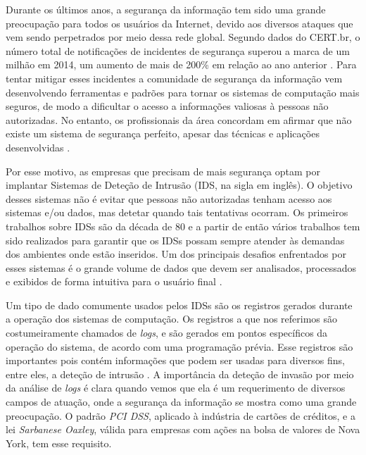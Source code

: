 \documentclass[
	12pt,				%
	openright,			%
	twoside,			%
	a4paper,			%
	english,			%
	spanish,			%
	brazil,				%
	]{abntex2}
\begin{document}
Durante os últimos anos, a segurança da informação tem sido uma grande preocupação para todos os usuários da Internet, devido aos diversos ataques que vem sendo perpetrados por meio dessa rede global. Segundo dados do CERT.br, o número total de notificações de incidentes de segurança superou a marca de um milhão em 2014, um aumento de mais de 200\% em relação ao ano anterior \cite{incidentes2015incidentes}. Para tentar mitigar esses incidentes a comunidade de segurança da informação vem desenvolvendo ferramentas e padrões para tornar os sistemas de computação mais seguros, de modo a dificultar o acesso a informações valiosas à pessoas não autorizadas. No entanto, os profissionais da área concordam em afirmar que não existe um sistema de segurança perfeito, apesar das técnicas e aplicações desenvolvidas \cite{dua2011data}.

Por esse motivo, as empresas que precisam de mais segurança optam por implantar Sistemas de Deteção de Intrusão (IDS, na sigla em inglês). O objetivo desses sistemas não é evitar que pessoas não autorizadas tenham acesso aos sistemas e/ou dados, mas detetar quando tais tentativas ocorram. Os primeiros trabalhos sobre IDSs são da década de 80 \cite{anderson1980computer, denning1987intrusion} e a partir de então vários trabalhos tem sido realizados para garantir que os IDSs possam sempre atender às demandas dos ambientes onde estão inseridos. Um dos principais desafios enfrentados por esses sistemas é o grande volume de dados que devem ser analisados, processados e exibidos de forma intuitiva para o usuário final \cite{big2013big, nassar2013secure}.


Um tipo de dado comumente usados pelos IDSs são os registros gerados durante a operação dos sistemas de computação. Os registros a que nos referimos são costumeiramente chamados de \emph{logs}, e são gerados em pontos específicos da operação do sistema, de acordo com uma programação prévia. Esse registros são importantes pois contém informações que podem ser usadas para diversos fins, entre eles, a deteção de intrusão \cite{jiang2008automated,oliner2012advances,nagappan2010abstracting}. A importância da deteção de invasão por meio da análise de \emph{logs} é clara quando vemos que ela é um requerimento de diversos campos de atuação, onde a segurança da informação se mostra como uma grande preocupação. O padrão \emph{PCI DSS}, aplicado à indústria de cartões de créditos, e a lei \emph{Sarbanese Oaxley}, válida para empresas com ações na bolsa de valores de Nova York, tem esse requisito.
\end{document}
